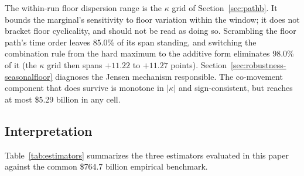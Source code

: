 \documentclass[12pt]{article}
\begin{document}
\begin{table}[H]
\begin{threeparttable}
\begin{tablenotes}[flushleft]
\item The within-run floor dispersion range is the $\kappa$ grid of Section~\ref{sec:pathb}. It bounds the marginal's sensitivity to floor variation within the window; it does not bracket floor cyclicality, and should not be read as doing so. Scrambling the floor path's time order leaves 85.0\% of its span standing, and switching the combination rule from the hard maximum to the additive form eliminates 98.0\% of it (the $\kappa$ grid then spans $+11.22$ to $+11.27$ points). Section~\ref{sec:robustness-seasonalfloor} diagnoses the Jensen mechanism responsible. The co-movement component that does survive is monotone in $|\kappa|$ and sign-consistent, but reaches at most \$5.29 billion in any cell.
\end{tablenotes}
\end{threeparttable}
\end{table}

\subsection{Interpretation}\label{sec:hazard-interp}

Table~\ref{tab:estimators} summarizes the three estimators evaluated in this paper against the common \$764.7 billion empirical benchmark.
\end{document}
